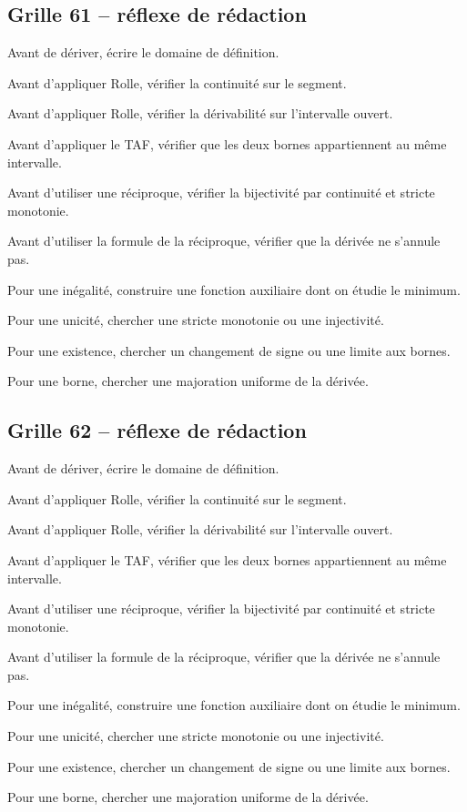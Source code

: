 \documentclass[11pt,a4paper]{article}
\begin{document}
\subsection*{Grille 61 -- réflexe de rédaction}

\begin{methodebox}

Avant de dériver, écrire le domaine de définition.

Avant d'appliquer Rolle, vérifier la continuité sur le segment.

Avant d'appliquer Rolle, vérifier la dérivabilité sur l'intervalle ouvert.

Avant d'appliquer le TAF, vérifier que les deux bornes appartiennent au même intervalle.

Avant d'utiliser une réciproque, vérifier la bijectivité par continuité et stricte monotonie.

Avant d'utiliser la formule de la réciproque, vérifier que la dérivée ne s'annule pas.

Pour une inégalité, construire une fonction auxiliaire dont on étudie le minimum.

Pour une unicité, chercher une stricte monotonie ou une injectivité.

Pour une existence, chercher un changement de signe ou une limite aux bornes.

Pour une borne, chercher une majoration uniforme de la dérivée.

\end{methodebox}

\subsection*{Grille 62 -- réflexe de rédaction}

\begin{methodebox}

Avant de dériver, écrire le domaine de définition.

Avant d'appliquer Rolle, vérifier la continuité sur le segment.

Avant d'appliquer Rolle, vérifier la dérivabilité sur l'intervalle ouvert.

Avant d'appliquer le TAF, vérifier que les deux bornes appartiennent au même intervalle.

Avant d'utiliser une réciproque, vérifier la bijectivité par continuité et stricte monotonie.

Avant d'utiliser la formule de la réciproque, vérifier que la dérivée ne s'annule pas.

Pour une inégalité, construire une fonction auxiliaire dont on étudie le minimum.

Pour une unicité, chercher une stricte monotonie ou une injectivité.

Pour une existence, chercher un changement de signe ou une limite aux bornes.

Pour une borne, chercher une majoration uniforme de la dérivée.

\end{methodebox}
\end{document}
